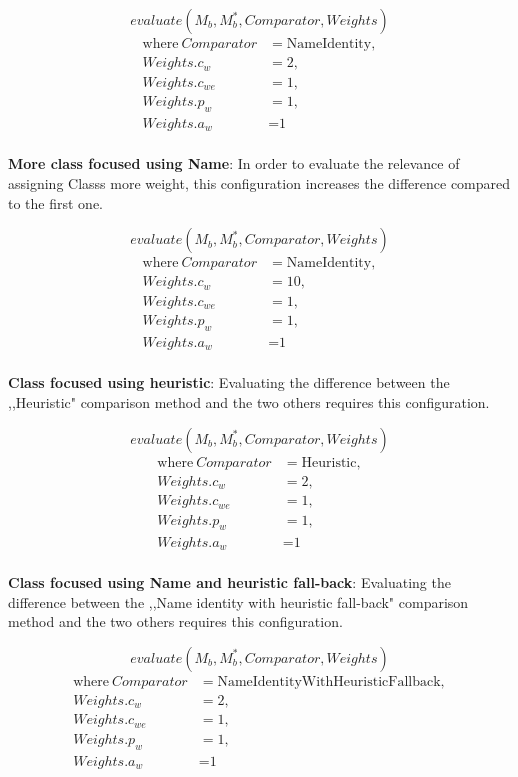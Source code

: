 $$evaluate(M_b, M_b^*, Comparator, Weights)$$
\begin{align*}
  \text{where}~Comparator &= \text{NameIdentity}, \\
  Weights.c_w &= \text{2}, \\
  Weights.c_{we} &= \text{1}, \\
  Weights.p_w &= \text{1}, \\
  Weights.a_w &= \text{1} \\
\end{align*}

\textbf{More class focused using Name}: In order to evaluate the relevance of assigning \glspl{Class} more weight, this configuration increases the difference compared to the first one.

$$evaluate(M_b, M_b^*, Comparator, Weights)$$
\begin{align*}
  \text{where}~Comparator &= \text{NameIdentity}, \\
  Weights.c_w &= \text{10}, \\
  Weights.c_{we} &= \text{1}, \\
  Weights.p_w &= \text{1}, \\
  Weights.a_w &= \text{1} \\
\end{align*}

\textbf{Class focused using heuristic}: Evaluating the difference between the ,,Heuristic" comparison method and the two others requires this configuration.

$$evaluate(M_b, M_b^*, Comparator, Weights)$$
\begin{align*}
  \text{where}~Comparator &= \text{Heuristic}, \\
  Weights.c_w &= \text{2}, \\
  Weights.c_{we} &= \text{1}, \\
  Weights.p_w &= \text{1}, \\
  Weights.a_w &= \text{1} \\
\end{align*}

\textbf{Class focused using Name and heuristic fall-back}: Evaluating the difference between the ,,Name identity with heuristic fall-back" comparison method and the two others requires this configuration.

$$evaluate(M_b, M_b^*, Comparator, Weights)$$
\begin{align*}
  \text{where}~Comparator &= \text{NameIdentityWithHeuristicFallback}, \\
  Weights.c_w &= \text{2}, \\
  Weights.c_{we} &= \text{1}, \\
  Weights.p_w &= \text{1}, \\
  Weights.a_w &= \text{1} \\
\end{align*}

